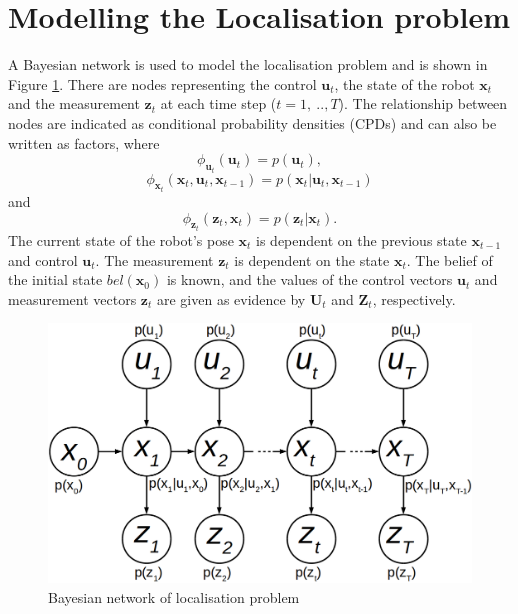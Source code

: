 \documentclass[12pt,oneside,openany,a4paper, %
afrikaans,english,
]{memoir}
\numberwithin{equation}{chapter}
\begin{document}
\section{Modelling the Localisation problem}\label{sec:model}
A Bayesian network is used to model the localisation problem and is shown in Figure \ref{fig:loc_bayes}. There are nodes representing the control $\bm{u}_t$, the state of the robot $\bm{x}_t$ and the measurement $\bm{z}_t$ at each time step ($t = 1,\ ..,T$). The relationship between nodes are indicated as conditional probability densities (CPDs) and can also be written as factors, where
\begin{equation}
\phi_{\bm{u}_t}(\bm{u}_t) = p(\bm{u}_t),
\end{equation}
\begin{equation}
\phi_{\bm{x}_t}(\bm{x}_t, \bm{u}_t, \bm{x}_{t-1}) = p(\bm{x}_t| \bm{u}_t, \bm{x}_{t-1}) 
\end{equation}
and
\begin{equation}
\phi_{\bm{z}_t}(\bm{z}_t, \bm{x}_t) = p(\bm{z}_t|\bm{x}_t). 
\end{equation}
The current state of the robot's pose $\bm{x}_t$ is dependent on the previous state $\bm{x}_{t-1}$ and control $\bm{u}_t$. The measurement $\bm{z}_t$ is dependent on the state $\bm{x}_t$. The belief of the initial state $bel(\bm{x}_0)$ is known, and the values of the control vectors $\bm{u}_t$ and measurement vectors $\bm{z}_t$ are given as evidence by $\bm{U}_t$ and $\bm{Z}_t$, respectively.

\begin{figure}
  \includegraphics[width=0.7\linewidth]{Figures/bayesnetloc.png}
  \centering
  \caption{Bayesian network of localisation problem}
  \label{fig:loc_bayes}
\end{figure}
\end{document}
